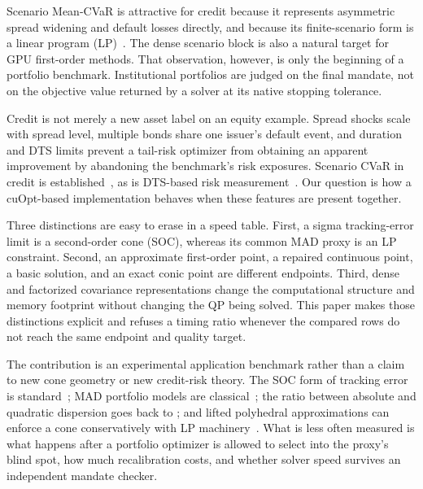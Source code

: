 \documentclass[11pt,a4paper]{article}
\begin{document}
Scenario Mean-CVaR is attractive for credit because it represents asymmetric
spread widening and default losses directly, and because its finite-scenario
form is a linear program (LP)~\citep{rockafellar2000cvar}. The dense scenario
block is also a natural target for GPU first-order methods. That observation,
however, is only the beginning of a portfolio benchmark. Institutional
portfolios are judged on the final mandate, not on the objective value returned
by a solver at its native stopping tolerance.

Credit is not merely a new asset label on an equity example. Spread shocks
scale with spread level, multiple bonds share one issuer's default event, and
duration and DTS limits prevent a tail-risk optimizer from obtaining an
apparent improvement by abandoning the benchmark's risk exposures.
Scenario CVaR in credit is established~\citep{andersson2001credit}, as is
DTS-based risk measurement~\citep{bendor2007dts}. Our question is how a
cuOpt-based implementation behaves when these features are present together.

Three distinctions are easy to erase in a speed table. First, a sigma
tracking-error limit is a second-order cone (SOC), whereas its common MAD proxy
is an LP constraint. Second, an approximate first-order point, a repaired
continuous point, a basic solution, and an exact conic point are different
endpoints. Third, dense and factorized covariance representations change the
computational structure and memory footprint without changing the QP being
solved. This
paper makes those distinctions explicit and refuses a timing ratio whenever
the compared rows do not reach the same endpoint and quality target.

The contribution is an experimental application benchmark rather than a claim
to new cone geometry or new credit-risk theory. The
SOC form of tracking error is standard~\citep{jorion2003tracking}; MAD portfolio
models are classical~\citep{konno1991mad}; the ratio between absolute and
quadratic dispersion goes back to \citet{geary1935ratio}; and lifted
polyhedral approximations can enforce a cone conservatively with LP
machinery~\citep{bental2001soc,vielma2008lifted}. What is less often measured is
what happens after a portfolio optimizer is allowed to select into the proxy's
blind spot, how much recalibration costs, and whether solver speed survives an
independent mandate checker.
\end{document}
